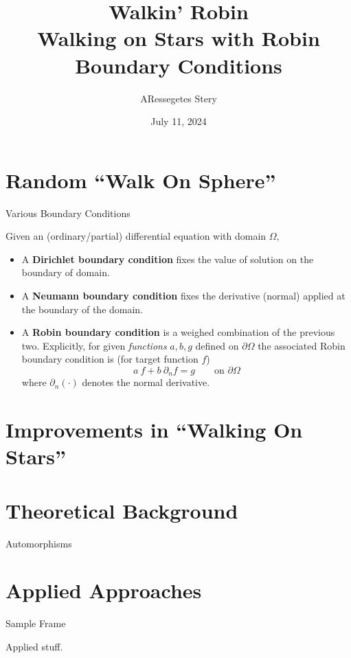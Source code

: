 \documentclass{beamer}
\title{Walkin' Robin \\[1pt] {\Large Walking on Stars with Robin Boundary Conditions}}
\author{ARessegetes Stery}
\date{July 11, 2024}
\begin{document}
\maketitle


\section{Random ``Walk On Sphere''}

\begin{frame}{Various Boundary Conditions}

	\begin{definition}
		Given an (ordinary/partial) differential equation with domain $\Omega$,
		\begin{itemize}
			\item A \textbf{Dirichlet boundary condition} fixes the value of solution on the boundary of domain. 
			\item A \textbf{Neumann boundary condition} fixes the derivative (normal) applied at the boundary of the domain.
			\item A \textbf{Robin boundary condition} is a weighed combination of the previous two. Explicitly, for given \emph{functions} $a, b, g$ defined on $\partial \Omega$ the associated Robin boundary condition is (for target function $f$)
			\[
				a\ f + b\ \partial_n f = g \qquad \text{on $\partial \Omega$}
			\]
			where $\partial_n(\cdot)$ denotes the normal derivative.
		\end{itemize}
	\end{definition}
	\horzline

\end{frame}


\section{Improvements in ``Walking On Stars''}

\begin{frame}
    
\end{frame}


\section{Theoretical Background}

\begin{frame}{Automorphisms}

\end{frame}


\section{Applied Approaches}

\begin{frame}{Sample Frame}

	Applied stuff.

\end{frame}


\thankframe
\end{document}
